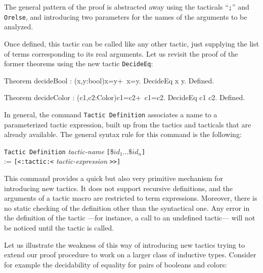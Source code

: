 The general pattern of the proof is abstracted away using the
tacticals ``\texttt{;}'' and \texttt{Orelse}, and introducing two
parameters for the names of the arguments to be analyzed.

Once defined, this tactic can be called like any other tactic, just
supplying the list of terms corresponding to its real arguments. Let us
revisit the proof of the former theorems using the new tactic
\texttt{DecideEq}:

\begin{coq_example*}
Theorem decideBool : (x,y:bool){x=y}+{~x=y}.
DecideEq x y.
Defined.
\end{coq_example*}
\begin{coq_example*}
Theorem decideColor : (c1,c2:Color){c1=c2}+{~c1=c2}.
DecideEq c1 c2.
Defined.
\end{coq_example*}

In general, the command \texttt{Tactic Definition} associates a name
to a parameterized tactic expression, built up from the tactics and
tacticals that are already available. The general syntax rule for this
command is the following:

\begin{tabbing}
\texttt{Tactic Definition} \textit{tactic-name} \= 
\texttt{[}\$$id_1\ldots \$id_n$\texttt{]}\\
\> := \texttt{[<:tactic:<} \textit{tactic-expression} \verb+>>]+
\end{tabbing}

This command provides a quick but also very primitive mechanism for
introducing new tactics. It does not support recursive definitions,
and the arguments of a tactic macro are restricted to term
expressions.  Moreover, there is no static checking of the definition
other than the syntactical one. Any error in the definition of the
tactic ---for instance, a call to an undefined tactic--- will not be
noticed until the tactic is called.


Let us illustrate the weakness of this way of introducing new tactics
trying to extend our proof procedure to work on a larger class of
inductive types.  Consider for example the decidability of equality
for pairs of booleans and colors:

